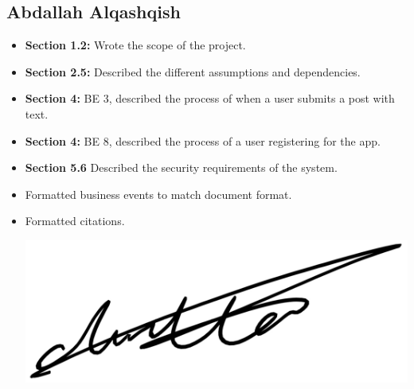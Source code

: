 \documentclass[]{article}
\begin{document}
\subsection{Abdallah Alqashqish}
\begin{itemize}
    \item \textbf{Section 1.2:} Wrote the scope of the project.
	\item \textbf{Section 2.5:} Described the different assumptions and dependencies.
	\item \textbf{Section 4:} BE 3, described the process of when a user submits a post with text.
	\item \textbf{Section 4:} BE 8, described the process of a user registering for the app.
	\item \textbf{Section 5.6} Described the security requirements of the system.
	\item Formatted business events to match document format.
	\item Formatted citations.
    \begin{center}
        \includegraphics[scale=0.1]{Images/abdallah.jpg}
    \end{center}
\end{itemize}




\end{document}
